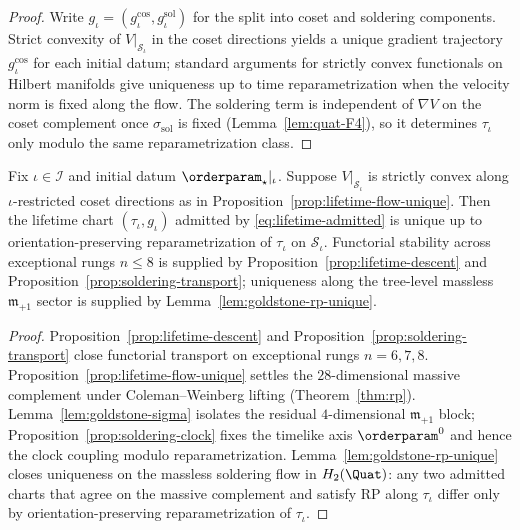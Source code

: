 \begin{proof}
Write $g_\iota=(g_\iota^{\mathrm{cos}},g_\iota^{\mathrm{sol}})$ for the
split into coset and soldering components. Strict convexity of
$V|_{\mathcal{S}_\iota}$ in the coset directions yields a unique gradient
trajectory $g_\iota^{\mathrm{cos}}$ for each initial datum; standard
arguments for strictly convex functionals on Hilbert manifolds give uniqueness
up to time reparametrization when the velocity norm is fixed along the flow.
The soldering term is independent of $\nabla V$ on the coset complement once
$\sigma_{\mathrm{sol}}$ is fixed (Lemma~\ref{lem:quat-F4}), so it determines
$\tau_\iota$ only modulo the same reparametrization class.
\end{proof}

\begin{theorem}\label{thm:lifetime-unique}
Fix $\iota\in\mathcal{I}$ and initial datum
$\orderparam_\star|_\iota$. Suppose $V|_{\mathcal{S}_\iota}$ is strictly
convex along $\iota$-restricted coset directions as in
Proposition~\ref{prop:lifetime-flow-unique}. Then the lifetime chart
$(\tau_\iota,g_\iota)$ admitted by \eqref{eq:lifetime-admitted} is unique up
to orientation-preserving reparametrization of $\tau_\iota$ on
$\mathcal{S}_\iota$. Functorial stability across exceptional rungs
$n\leq8$ is supplied by Proposition~\ref{prop:lifetime-descent} and
Proposition~\ref{prop:soldering-transport}; uniqueness along the tree-level
massless $\mathfrak{m}_{+1}$ sector is supplied by
Lemma~\ref{lem:goldstone-rp-unique}.
\end{theorem}

\begin{proof}
Proposition~\ref{prop:lifetime-descent} and
Proposition~\ref{prop:soldering-transport} close functorial transport on
exceptional rungs $n=6,7,8$. Proposition~\ref{prop:lifetime-flow-unique}
settles the $28$-dimensional massive complement under Coleman--Weinberg lifting
(Theorem~\ref{thm:rp}). Lemma~\ref{lem:goldstone-sigma} isolates the residual
$4$-dimensional $\mathfrak{m}_{+1}$ block; Proposition~\ref{prop:soldering-clock}
fixes the timelike axis $\orderparam^0$ and hence the clock coupling modulo
reparametrization. Lemma~\ref{lem:goldstone-rp-unique} closes uniqueness on
the massless soldering flow in $H_2(\Quat)$: any two admitted charts that
agree on the massive complement and satisfy RP along $\tau_\iota$ differ only
by orientation-preserving reparametrization of $\tau_\iota$.
\end{proof}


